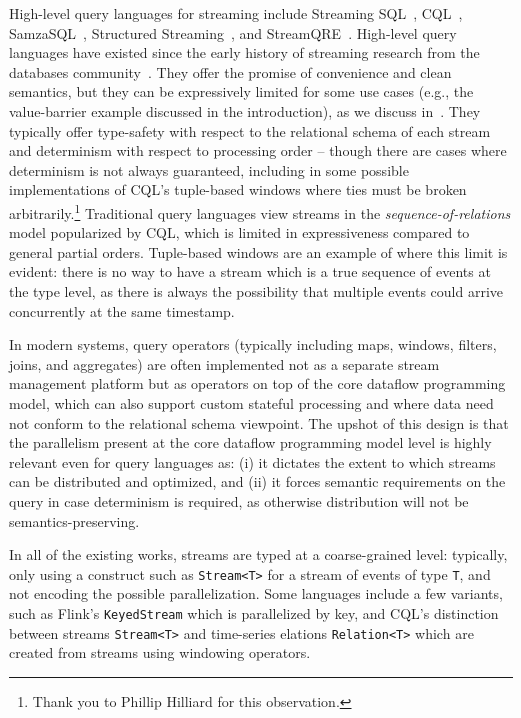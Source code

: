 High-level query languages for streaming include Streaming SQL~\cite{jain2008towards,begoli2019one}, CQL~\cite{arasu2003cql,ABW2006CQL}, SamzaSQL~\cite{pathirage2016samzasql}, Structured Streaming~\cite{armbrust2018structured},
and StreamQRE~\cite{StreamQRE}.
High-level query languages have existed since the early history
of streaming research from the databases community~\cite{stonebraker20058}.
They offer the promise of convenience and clean semantics, but they can be expressively limited for some use cases (e.g., the value-barrier example discussed in the introduction), as we discuss in~.
They typically offer type-safety with respect to the relational schema of each stream and determinism with respect to processing order --
though there are cases where determinism is not always guaranteed, including in some possible implementations of CQL's tuple-based windows where ties must be broken arbitrarily.\footnote{Thank you to Phillip Hilliard for this observation.}
Traditional query languages view streams in the \emph{sequence-of-relations} model popularized by CQL, which is limited in expressiveness compared to general partial orders.
Tuple-based windows are an example of where this limit is evident: there is no way to have a stream which is a true sequence of events at the type level, as there is always the possibility that multiple events could arrive concurrently at the same timestamp.

In modern systems, query operators (typically including maps, windows, filters, joins, and aggregates)
are often implemented not as a separate stream management platform but as
operators on top of the core dataflow programming model, which can also support custom stateful processing and where data need not conform to the relational schema viewpoint.
The upshot of this design is that the parallelism present at the core dataflow programming model level is highly relevant even for query languages as: (i) it dictates the extent to which streams can be distributed and optimized, and (ii) it forces semantic requirements on the query in case determinism is required, as otherwise distribution will not be semantics-preserving.

In all of the existing works, streams are typed at a coarse-grained level: typically, only using a construct such as \texttt{Stream<T>} for a stream of events of type \texttt{T}, and not encoding the possible parallelization.
Some languages include a few variants, such as Flink's \texttt{KeyedStream} which is parallelized by key, and CQL's distinction between streams \texttt{Stream<T>} and time-series elations \texttt{Relation<T>} which are created from streams using windowing operators.

